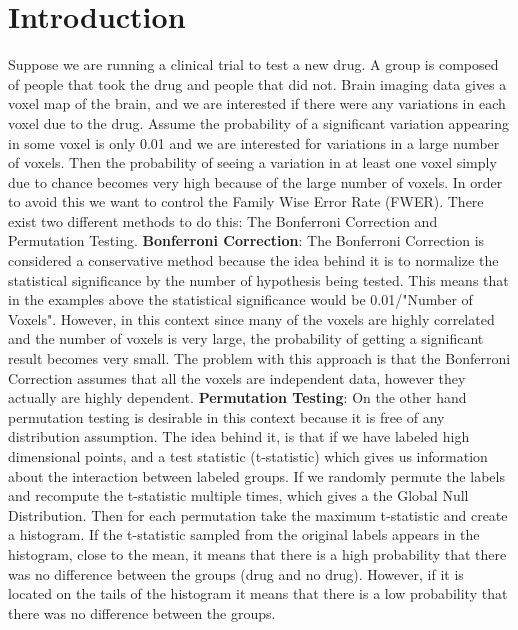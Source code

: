 \documentclass[10pt,letterpaper]{article}
\begin{document}
\section{Introduction}
Suppose we are running a clinical trial to test a new drug. A group is composed of people that took the drug and people that did not. Brain imaging data gives a voxel map of the brain, and we are interested if there were any variations in each voxel due to the drug. Assume the probability of a significant variation appearing in some voxel is only 0.01 and we are interested for variations in a large number of voxels. Then the probability of seeing a variation in at least one voxel simply due to chance becomes very high because of the large number of voxels. In order to avoid this we want to  control the Family Wise Error Rate (FWER). There exist two different methods to do this: The Bonferroni Correction and Permutation Testing. 
\newline
\newline
\textbf{Bonferroni Correction}: The Bonferroni Correction is considered a conservative method because the idea behind it is to normalize the statistical significance by the number of hypothesis being tested. This means that in the examples above the statistical significance would be 0.01/"Number of Voxels". However, in this context since many of the voxels are highly correlated and the number of voxels is very large, the probability of getting a significant result becomes very small. The problem with this approach is that the Bonferroni Correction assumes that all the voxels are independent data, however they actually are highly dependent.
\newline
\newline
\textbf{Permutation Testing}: On the other hand permutation testing is desirable in this context because it is free of any distribution assumption. The idea behind it, is that if we have labeled high dimensional points, and a test statistic (t-statistic) which gives us information about the interaction between labeled groups. If we randomly permute the labels and recompute the t-statistic multiple times, which gives a the Global Null Distribution. Then for each permutation take the maximum t-statistic and create a histogram. If the t-statistic sampled from the original labels appears in the histogram, close to the mean, it means that there is a high probability that there was no difference between the groups (drug and no drug). However, if it is located on the tails of the histogram it means that there is a low probability that there was no difference between the groups.
\end{document}
